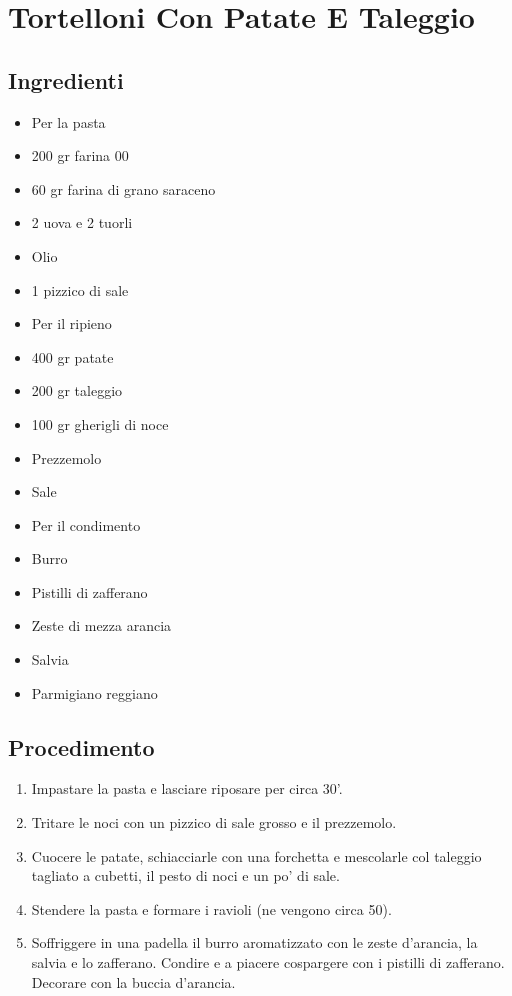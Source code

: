 \section{Tortelloni Con Patate E Taleggio}
\subsection{Ingredienti}
\begin{itemize}
\item Per la pasta  
\item 200 gr farina 00  
\item 60 gr farina di grano saraceno  
\item 2 uova e 2 tuorli  
\item Olio  
\item 1 pizzico di sale  
\item Per il ripieno  
\item 400 gr patate  
\item 200 gr taleggio  
\item 100 gr gherigli di noce  
\item Prezzemolo  
\item Sale  
\item Per il condimento  
\item Burro  
\item Pistilli di zafferano  
\item Zeste di mezza arancia  
\item Salvia  
\item Parmigiano reggiano
\end{itemize}
\subsection{Procedimento}
\begin{enumerate}
\item  Impastare la pasta e lasciare riposare per circa 30'.  
\item  Tritare le noci con un pizzico di sale grosso e il prezzemolo.  
\item  Cuocere le patate, schiacciarle con una forchetta e mescolarle col taleggio tagliato a cubetti, il pesto di noci e un po' di sale.  
\item  Stendere la pasta e formare i ravioli (ne vengono circa 50).  
\item  Soffriggere in una padella il burro aromatizzato con le zeste d'arancia, la salvia e lo zafferano. Condire e a piacere cospargere con i pistilli di zafferano. Decorare con la buccia d'arancia.
\end{enumerate}
